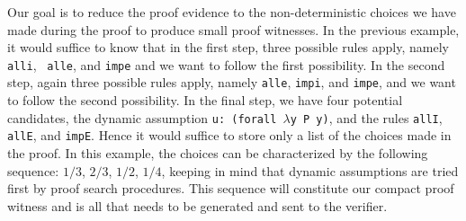 \documentclass{acmconf}
\newcommand{\figfoot}{\vspace{1ex}\hrule}
\newcommand{\fighead}{\hrule\vspace{1.5ex}}
\newcommand{\nil}{\mathsf{nil}}
\newcommand{\vd}{\vdash}
\newcommand{\arrow}{\rightarrow}
\newcommand{\oftp}{\mathord{:}}
\begin{document}

Our goal is to reduce the proof evidence to the non-deterministic
choices we have made during the proof to produce small proof
witnesses. In the previous example, it would suffice to know that in
the first step, three possible rules apply, namely {\tt alli}, {\tt
alle}, and {\tt impe} and we want to follow the first possibility. In
the second step, again three possible rules apply, namely {\tt alle},
{\tt impi}, and {\tt impe}, and we want to follow the second
possibility. In the final step, we have four potential candidates, the
dynamic assumption {\tt u: (forall $\lambda\!\!$y P y)}, and the rules
{\tt allI}, {\tt allE}, and {\tt impE}.  Hence it would suffice to
store only a list of the choices made in the proof. In this example,
the choices can be characterized by the following sequence: $1/3$,
$2/3$, $1/2$, $1/4$, keeping in mind that dynamic assumptions are
tried first by proof search procedures. This sequence will constitute
our compact proof witness and is all that needs to be generated and
sent to the verifier. 
\end{document}
